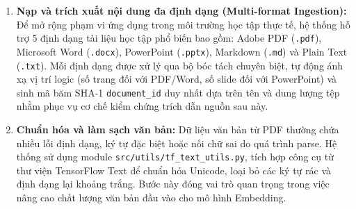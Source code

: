 ﻿\documentclass[12pt]{article}
\begin{document}
\begin{enumerate}
    \item \textbf{Nạp và trích xuất nội dung đa định dạng (Multi-format Ingestion):} Để mở rộng phạm vi ứng dụng trong môi trường học tập thực tế, hệ thống hỗ trợ 5 định dạng tài liệu học tập phổ biến bao gồm: Adobe PDF (\texttt{.pdf}), Microsoft Word (\texttt{.docx}), PowerPoint (\texttt{.pptx}), Markdown (\texttt{.md}) và Plain Text (\texttt{.txt}). Mỗi định dạng được xử lý qua bộ bóc tách chuyên biệt, tự động ánh xạ vị trí logic (số trang đối với PDF/Word, số slide đối với PowerPoint) và sinh mã băm SHA-1 \texttt{document\_id} duy nhất dựa trên tên và dung lượng tệp nhằm phục vụ cơ chế kiểm chứng trích dẫn nguồn sau này.
    
    \item \textbf{Chuẩn hóa và làm sạch văn bản:} Dữ liệu văn bản từ PDF thường chứa nhiều lỗi định dạng, ký tự đặc biệt hoặc nối chữ sai do quá trình parse. Hệ thống sử dụng module \texttt{src/utils/tf\_text\_utils.py}, tích hợp công cụ từ thư viện TensorFlow Text để chuẩn hóa Unicode, loại bỏ các ký tự rác và định dạng lại khoảng trắng. Bước này đóng vai trò quan trọng trong việc nâng cao chất lượng văn bản đầu vào cho mô hình Embedding.
    

\end{enumerate}
\end{document}

